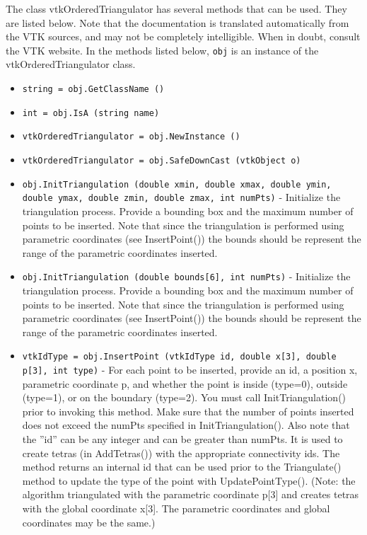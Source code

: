 The class vtkOrderedTriangulator has several methods that can be used.
  They are listed below.
Note that the documentation is translated automatically from the VTK sources,
and may not be completely intelligible.  When in doubt, consult the VTK website.
In the methods listed below, \verb|obj| is an instance of the vtkOrderedTriangulator class.
\begin{itemize}
\item  \verb|string = obj.GetClassName ()|

\item  \verb|int = obj.IsA (string name)|

\item  \verb|vtkOrderedTriangulator = obj.NewInstance ()|

\item  \verb|vtkOrderedTriangulator = obj.SafeDownCast (vtkObject o)|

\item  \verb|obj.InitTriangulation (double xmin, double xmax, double ymin, double ymax, double zmin, double zmax, int numPts)| -  Initialize the triangulation process. Provide a bounding box and
 the maximum number of points to be inserted. Note that since the
 triangulation is performed using parametric coordinates (see
 InsertPoint()) the bounds should be represent the range of the
 parametric coordinates inserted.
 

\item  \verb|obj.InitTriangulation (double bounds[6], int numPts)| -  Initialize the triangulation process. Provide a bounding box and
 the maximum number of points to be inserted. Note that since the
 triangulation is performed using parametric coordinates (see
 InsertPoint()) the bounds should be represent the range of the
 parametric coordinates inserted.
 

\item  \verb|vtkIdType = obj.InsertPoint (vtkIdType id, double x[3], double p[3], int type)| -  For each point to be inserted, provide an id, a position x, parametric
 coordinate p, and whether the point is inside (type=0), outside
 (type=1), or on the boundary (type=2). You must call InitTriangulation()
 prior to invoking this method. Make sure that the number of points
 inserted does not exceed the numPts specified in
 InitTriangulation(). Also note that the ''id'' can be any integer and can
 be greater than numPts. It is used to create tetras (in AddTetras()) with
 the appropriate connectivity ids. The method returns an internal id that
 can be used prior to the Triangulate() method to update the type of the
 point with UpdatePointType(). (Note: the algorithm triangulated with the
 parametric coordinate p[3] and creates tetras with the global coordinate
 x[3]. The parametric coordinates and global coordinates may be the same.)


\end{itemize}
